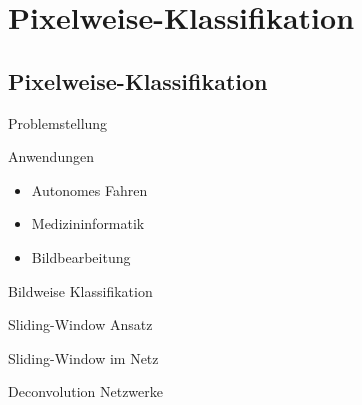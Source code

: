 \section{Pixelweise-Klassifikation}

\subsection*{Pixelweise-Klassifikation}

\begin{frame}{Problemstellung}

\end{frame}


\begin{frame}{Anwendungen}

\begin{itemize}
\item Autonomes Fahren
\item Medizininformatik
\item Bildbearbeitung
\end{itemize}

\end{frame}

\begin{frame}{Bildweise Klassifikation}

\end{frame}

\begin{frame}{Sliding-Window Ansatz}

\end{frame}

\begin{frame}{Sliding-Window im Netz}

\end{frame}

\begin{frame}{Deconvolution Netzwerke}

\end{frame}